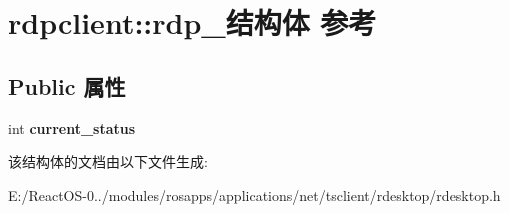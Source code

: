 \hypertarget{structrdpclient_1_1rdp__}{}\section{rdpclient\+:\+:rdp\+\_\+结构体 参考}
\label{structrdpclient_1_1rdp__}
\subsection*{Public 属性}
\begin{DoxyCompactItemize}
\item 
\mbox{\label{structrdpclient_1_1rdp___a9b9a7b42d2bc4fe894007ea173298e5d}} 
int {\bfseries current\+\_\+status}
\end{DoxyCompactItemize}


该结构体的文档由以下文件生成\+:\begin{DoxyCompactItemize}
\item 
E\+:/\+React\+O\+S-\/0../modules/rosapps/applications/net/tsclient/rdesktop/rdesktop.\+h\end{DoxyCompactItemize}
